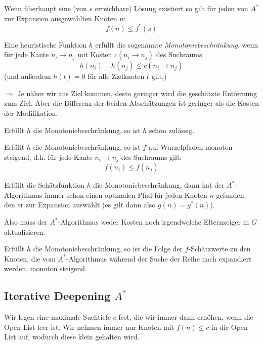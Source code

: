 \documentclass[runningheads,deutsch]{llncs}
\begin{document}
\begin{corollary}
    Wenn überhaupt eine (von $s$ erreichbare) Lösung existiert so gilt für jeden von $A^*$ zur Expansion ausgewählten Knoten $n$:
    \[ f(n) \leq f^*(s) \]
\end{corollary}

\begin{definition}
    Eine heuristische Funktion $h$ erfüllt die sogenannte \textit{Monotoniebeschränkung}, wenn für jede Kante $n_i \rightarrow n_j$ mit Kosten $c(n_i \rightarrow n_j)$ des Suchraums
    \[ h(n_i) - h(n_j) \leq c(n_i \rightarrow n_j)\]
    (und außerdem $h(t) = 0$ für alle Zielknoten $t$ gilt.)

    $\Rightarrow$ Je näher wir ans Ziel kommen, desto geringer wird die geschätzte Entfernung zum Ziel. Aber die Differenz der beiden Abschätzungen ist geringer als die Kosten der Modifikation.
\end{definition}

\begin{lemma}
    Erfüllt $h$ die Monotoniebeschränkung, so ist $h$ schon zulässig.
\end{lemma}

\begin{lemma}
    Erfüllt $h$ die Monotoniebeschränkung, so ist $f$ auf Wurzelpfaden monoton steigend, d.h. für jede Kante $n_i \rightarrow n_j$ des Suchraums gilt: 
    \[ f(n_i) \leq f(n_j) \]
\end{lemma}

\begin{theorem}
    Erfüllt die Schätzfunktion $h$ die Monotoniebeschränkung, dann hat der $A^*$-Algorithmus immer schon einen optimalen Pfad für jeden Knoten $n$ gefunden, den er zur Expansion auswählt (es gilt dann also $g(n) = g^*(n)$).

    Also muss der $A^*$-Algorithmus weder Kosten noch irgendwelche Elternzeiger in $G$ aktualisieren.
\end{theorem}

\begin{theorem}
    Erfüllt $h$ die Monotoniebeschränkung, so ist die Folge der $f$-Schätzwerte zu den Knoten, die vom $A^*$-Algorithmus während der Suche der Reihe nach expandiert werden, monoton steigend.
\end{theorem}

\subsection{Iterative Deepening $A^*$}
Wir legen eine maximale Suchtiefe $c$ fest, die wir immer dann erhöhen, wenn die Open-List leer ist. Wir nehmen immer nur Knoten mit $f(n) \leq c$ in die Open-List auf, wodurch diese klein gehalten wird.
\end{document}
